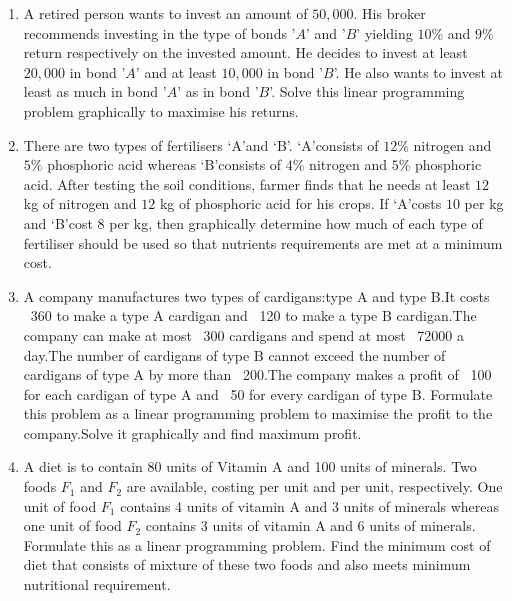 \begin{enumerate}
	\item A retired person wants to invest an amount of \rupee $50,000$. His broker recommends investing in the type of bonds '$A$' and '$B$' yielding $10\%$ and $9\%$ return respectively on the invested amount. He decides to invest at least \rupee $20,000$ in bond '$A$' and at least \rupee $10,000$ in bond '$B$'. He also wants to invest at least as much in bond '$A$' as in bond '$B$'. Solve this linear programming problem graphically to maximise his returns.
	\item There are two types of fertilisers \lq A\rq and \lq B\rq. \lq A\rq consists of $12\%$ nitrogen and $5\%$ phosphoric acid whereas \lq B\rq consists of $4\%$ nitrogen and $5\%$ phosphoric acid. After testing the soil conditions, farmer finds that he needs at least $12$ kg of nitrogen and $12$ kg of phosphoric acid for his crops. If \lq A\rq costs \rupee $10$ per kg and \lq B\rq cost \rupee $8$ per kg, then graphically determine how much of each type of fertiliser should be used so that nutrients requirements are met at a minimum cost.
	\item A company manufactures two types of cardigans:type A and type B.It costs \rupee~360 to make a type A cardigan and \rupee~120 to make a type B cardigan.The company can make at most \rupee~300 cardigans and spend at most \rupee~72000 a day.The number of cardigans of type B cannot exceed the number of cardigans of type A by more than \rupee~200.The company makes a profit of \rupee~100 for each cardigan of type A and \rupee~50 for every cardigan of type B.
	      Formulate this problem as a linear programming problem to maximise the profit to the company.Solve it graphically and find maximum profit.	
 	\item A diet is to contain 80 units of Vitamin A and 100 units of minerals. Two foods $F_1$ and $F_2$ are available, costing  per unit and  per unit, respectively. One unit of food $F_1$ contains 4 units of vitamin A and 3 units of minerals whereas one unit of food $F_2$ contains 3 units of vitamin A and 6 units of minerals. Formulate this as a linear programming problem. Find the minimum cost of diet that consists of mixture of these two foods and also meets minimum nutritional requirement.

\end{enumerate}
